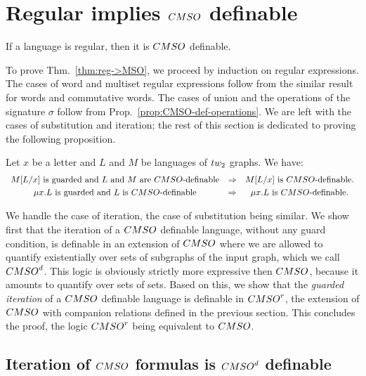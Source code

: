 \section{Regular implies $\CMSO$ definable}\label{sec:reg->def}


\begin{theorem}\label{thm:reg->MSO}
If a language is regular, then it is $\CMSO$ definable. 
\end{theorem}

To prove Thm.~\ref{thm:reg->MSO}, we proceed by induction on  regular expressions. The cases of word and multiset regular expressions follow from the similar result for words and commutative words. The cases of union and the operations of the signature $\sigma$ follow from Prop.~\ref{prop:CMSO-def-operations}. We are left with the cases of substitution and iteration; the rest of this section is dedicated to proving the following proposition.
 
\begin{proposition}\label{prop:Guarded-It-Is-CMSO}
Let $x$ be a letter and $L$ and $M$ be languages of $\TWT$ graphs. We have:
$$
\begin{array}{ccc}
\text{$M [L/x]$ is guarded and $L$ and $M$ are $\CMSO$-definable} & \Rightarrow & \text{$M[L/x]$ is $\CMSO$-definable.}\\[3pt]
\text{$\mu x. L$ is guarded and $L$ is $\CMSO$-definable} &\Rightarrow& \text{$\mu x. L$ is $\CMSO$-definable.}
\end{array}$$
\end{proposition}


We handle the case of iteration, the case of substitution being similar. We show first that the iteration of a $\CMSO$ definable language, without any guard condition, is definable in an extension of $\CMSO$ where we are allowed to quantify existentially over sets of subgraphs of the input graph, which we call $\CMSOd$. This logic is obviously strictly more expressive then $\CMSO$, because it amounts to quantify over sets of sets. Based on this, we show that the  \emph{guarded iteration} of a $\CMSO$ definable language is  definable in $\CMSO^r$, the extension of $\CMSO$ with companion relations defined in the previous section. This concludes the proof, the logic $\CMSO^r$  being equivalent to $\CMSO$.



\subsection{Iteration of $\CMSO$ formulas is $\CMSOd$ definable}

